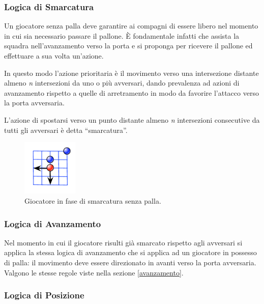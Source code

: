 \documentclass[aps,letterpaper,10pt]{article}
\begin{document}
\subsubsection{Logica di Smarcatura}

Un giocatore senza palla deve garantire ai compagni di essere libero nel momento in cui sia necessario passare il
pallone. \`E fondamentale infatti che assista la squadra nell'avanzamento verso la porta e si proponga per ricevere il
pallone ed effettuare a sua volta un'azione. \vspace{3mm}

In questo modo l'azione prioritaria \`e il movimento verso una intersezione distante almeno \emph{n} intersezioni da uno
o pi\`u avversari, dando prevalenza ad azioni di avanzamento rispetto a quelle di arretramento in modo da favorire
l'attacco verso la porta avversaria.

L'azione di spostarsi verso un punto distante almeno \emph{n} intersezioni consecutive da tutti gli avversari \`e detta
``smarcatura''.

\begin{figure}[H]
	\begin{center}
		\includegraphics[width=100px]{images/unmark.pdf}
	\end{center}
\caption{Giocatore in fase di smarcatura senza palla.}
\end{figure}

\subsubsection{Logica di Avanzamento}

Nel momento in cui il giocatore risulti gi\`a smarcato rispetto agli avversari si applica la stessa logica di
avanzamento che si applica ad un giocatore in possesso di palla: il movimento deve essere direzionato in avanti verso la
porta avversaria. Valgono le stesse regole viste nella sezione \ref{avanzamento}.

\subsubsection{Logica di Posizione}
\end{document}

